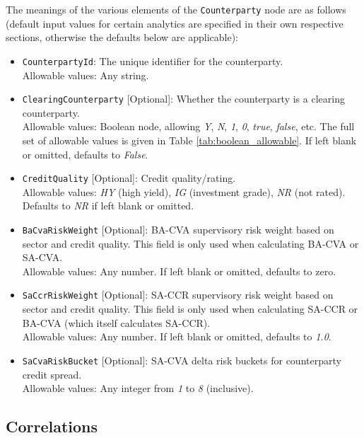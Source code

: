 The meanings of the various elements of the \lstinline!Counterparty!
node are as follows (default input values for certain analytics are
specified in their own respective sections, otherwise the
defaults below are applicable):
\begin{itemize}
\item \lstinline!CounterpartyId!: The unique identifier for the counterparty.\\
  Allowable values: Any string.
\item \lstinline!ClearingCounterparty! [Optional]: Whether the counterparty is a
clearing counterparty.\\
  Allowable values: Boolean node, allowing \emph{Y}, \emph{N}, \emph{1}, \emph{0},
  \emph{true}, \emph{false}, etc. The full set of allowable values is given in Table
  \ref{tab:boolean_allowable}. If left blank or omitted, defaults to \emph{False}.
\item \lstinline!CreditQuality! [Optional]: Credit quality/rating. \\
  Allowable values: \emph{HY} (high yield), \emph{IG} (investment grade), 
  \emph{NR} (not rated). Defaults to \emph{NR} if left blank or omitted.
\item \lstinline!BaCvaRiskWeight! [Optional]: BA-CVA supervisory risk weight based
on sector and credit quality\ifdefined{}\fi. This field is only used when calculating BA-CVA or SA-CVA.\\
  Allowable values: Any number. If left blank or omitted, defaults to zero.
\item \lstinline!SaCcrRiskWeight! [Optional]: SA-CCR supervisory risk weight based
on sector and credit quality\ifdefined{}\fi. This field is only used when calculating
SA-CCR or BA-CVA (which itself calculates SA-CCR).\\
  Allowable values: Any number. If left blank or omitted, defaults to \emph{1.0}.
\item \lstinline!SaCvaRiskBucket! [Optional]: SA-CVA delta risk buckets for
counterparty credit spread.\\
  Allowable values: Any integer from \emph{1} to \emph{8} (inclusive).
\end{itemize}

\subsection{Correlations}

